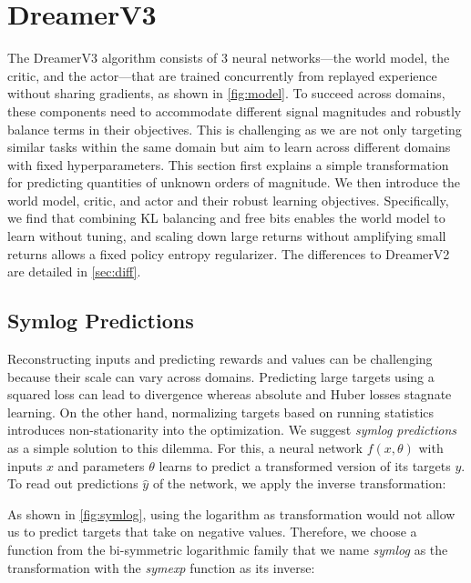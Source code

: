 

\section*{DreamerV3}
\label{sec:method}

The DreamerV3 algorithm consists of 3 neural networks---the world model, the critic, and the actor---that are trained concurrently from replayed experience without sharing gradients, as shown in \cref{fig:model}.
To succeed across domains, these components need to accommodate different signal magnitudes and robustly balance terms in their objectives.
This is challenging as we are not only targeting similar tasks within the same domain but aim to learn across different domains with fixed hyperparameters.
This section first explains a simple transformation for predicting quantities of unknown orders of magnitude.
We then introduce the world model, critic, and actor and their robust learning objectives.
Specifically, we find that combining KL balancing and free bits enables the world model to learn without tuning, and scaling down large returns without amplifying small returns allows a fixed policy entropy regularizer.
The differences to DreamerV2 are detailed in \cref{sec:diff}.

\subsection*{Symlog Predictions}

Reconstructing inputs and predicting rewards and values can be challenging because their scale can vary across domains.
Predicting large targets using a squared loss can lead to divergence whereas absolute and Huber losses \citep{mnih2015dqn} stagnate learning.
On the other hand, normalizing targets based on running statistics \citep{schulman2017ppo} introduces non-stationarity into the optimization.
We suggest \emph{symlog predictions} as a simple solution to this dilemma.
For this, a neural network $f(x,\theta)$ with inputs $x$ and parameters $\theta$ learns to predict a transformed version of its targets $y$.
To read out predictions $\hat{y}$ of the network, we apply the inverse transformation:


As shown in \cref{fig:symlog}, using the logarithm as transformation would not allow us to predict targets that take on negative values.
Therefore, we choose a function from the bi-symmetric logarithmic family \citep{webber2012symlog} that we name \emph{symlog} as the transformation with the \emph{symexp} function as its inverse:

